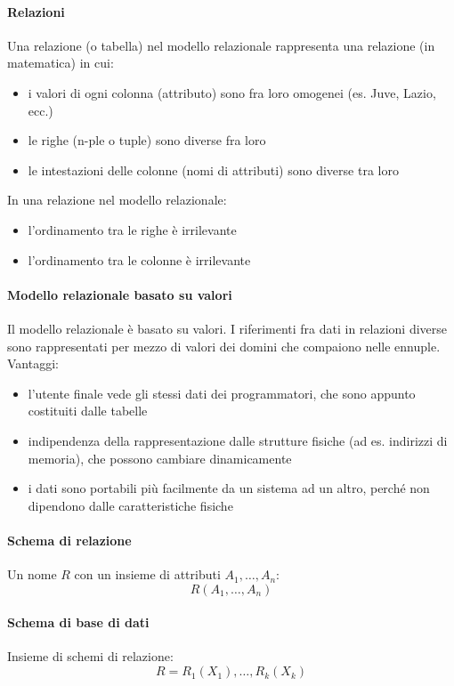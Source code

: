 \documentclass[12pt]{article}
\begin{document}
    \paragraph{Relazioni}
    Una relazione (o tabella) nel modello relazionale rappresenta una relazione (in matematica) in cui:
    \begin{itemize}
        \item i valori di ogni colonna (attributo) sono fra loro omogenei (es. Juve, Lazio, ecc.)
        \item le righe (n-ple o tuple) sono diverse fra loro
        \item le intestazioni delle colonne (nomi di attributi) sono diverse tra loro 
    \end{itemize}
    In una relazione nel modello relazionale:
    \begin{itemize}
        \item l’ordinamento tra le righe è irrilevante
        \item l’ordinamento tra le colonne è irrilevante 
    \end{itemize}
    \paragraph{Modello relazionale basato su valori}
    Il modello relazionale è basato su valori. I riferimenti fra dati in relazioni diverse sono rappresentati per mezzo di valori dei domini che compaiono nelle ennuple. \\Vantaggi:
    \begin{itemize}
        \item l’utente finale vede gli stessi dati dei programmatori, che sono appunto costituiti dalle tabelle
        \item indipendenza della rappresentazione dalle strutture fisiche (ad es. indirizzi di memoria), che possono cambiare dinamicamente
        \item i dati sono portabili più facilmente da un sistema ad un altro, perché non dipendono dalle caratteristiche fisiche
    \end{itemize}
    \paragraph{Schema di relazione}
    Un nome $R$  con un insieme di attributi $A_1, \dots, A_n$: $$R(A_1, \dots, A_n)$$
    \paragraph{Schema di base di dati}
    Insieme di schemi di relazione: $$R = {R_1(X_1), \dots, R_k(X_k)}$$
\end{document}
